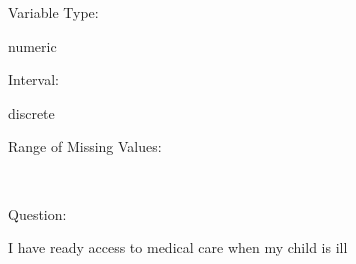 \documentclass[
]{article}
\begin{document}
\begin{minipage}[t]{0.3\linewidth}

Variable Type:

\end{minipage}%
\begin{minipage}[t]{0.7\linewidth}

numeric

\end{minipage}

\begin{minipage}[t]{0.3\linewidth}

Interval:

\end{minipage}%
\begin{minipage}[t]{0.7\linewidth}

discrete

\end{minipage}

\begin{minipage}[t]{0.3\linewidth}

Range of Missing Values:

\end{minipage}%
\begin{minipage}[t]{0.7\linewidth}

~

\end{minipage}

\begin{minipage}[t]{0.3\linewidth}

Question:

\end{minipage}%
\begin{minipage}[t]{0.7\linewidth}

I have ready access to medical care when my child is ill

\end{minipage}
\end{document}
